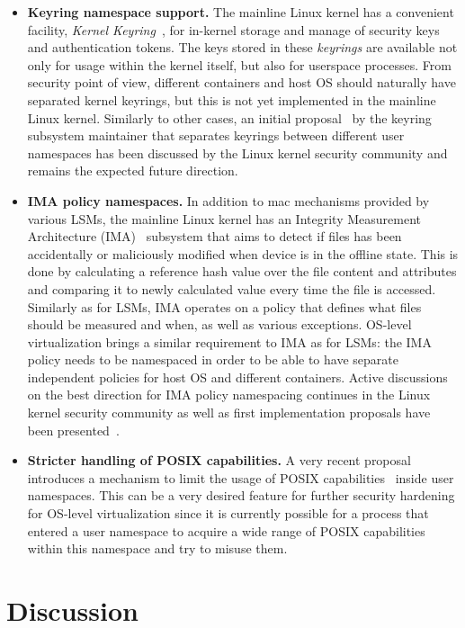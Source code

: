 \begin{itemize}
  \item \textbf{Keyring namespace support.} The mainline Linux kernel has a convenient facility, \textit{Kernel Keyring}~\cite{keyrings}, for in-kernel storage and manage of security keys and authentication tokens. The keys stored in these \textit{keyrings} are available not only for usage within the kernel itself, but also for userspace processes. From security point of view, different containers and host OS should naturally have separated kernel keyrings, but this is not yet implemented in the mainline Linux kernel. Similarly to other cases, an initial proposal~\cite{howells2016} by the keyring subsystem maintainer that separates keyrings between different user namespaces has been discussed by the Linux kernel security community and remains the expected future direction. 
	\item \textbf{IMA policy namespaces.} In addition to \gls{mac} mechanisms provided by various LSMs, the mainline Linux kernel has an Integrity Measurement Architecture (IMA)~\cite{ima} subsystem that aims to detect if files has been accidentally or maliciously modified when device is in the offline state. This is done by calculating a reference hash value over the file content and attributes and comparing it to newly calculated value every time the file is accessed. Similarly as for LSMs, IMA operates on a policy that defines what files should be measured and when, as well as various exceptions. OS-level virtualization brings a similar requirement to IMA as for LSMs: the IMA policy needs to be namespaced in order to be able to have separate independent policies for host OS and different containers. Active discussions on the best direction for IMA policy namespacing continues in the Linux kernel security community as well as first implementation proposals have been presented~\cite{magalhaes2017}. 
	\item \textbf{Stricter handling of POSIX capabilities.} A very recent proposal~\cite{Bandewar2017} introduces a mechanism to limit the usage of POSIX capabilities~\cite{caps} inside user namespaces. This can be a very desired feature for further security hardening for OS-level virtualization since it is currently possible for a process that entered a user namespace to acquire a wide range of POSIX capabilities within this namespace and try to misuse them. 
\end{itemize}


\section{Discussion}

